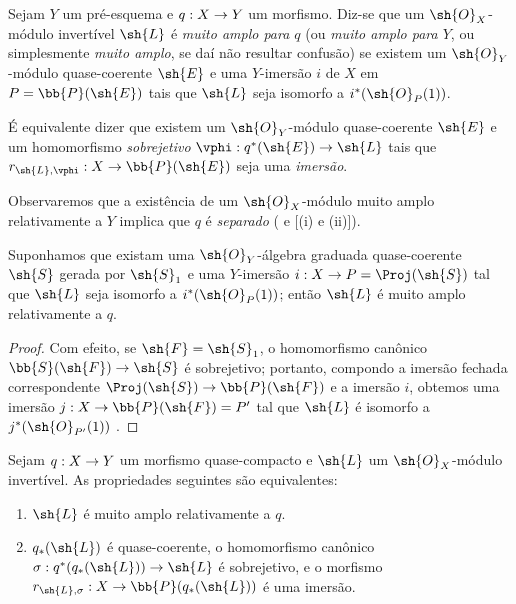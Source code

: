 \documentclass[oneside,10pt]{amsart}
\makeatletter
\newcommand{\ega@arrow}[2]{\mathchoice{#1}{#2}{#2}{#2}}
\renewcommand{\to}{\ega@arrow{\longrightarrow}{\rightarrow}}
\let\EGAOriginalLabel\label
\renewcommand{\label}[1]{\phantomsection\EGAOriginalLabel{#1}}
\makeatother
\begin{document}
\begin{definition}[4.4.2]
\label{II.4.4.2}
Sejam $Y$ um pré-esquema e $q:X\to Y$ um morfismo.
Diz-se que um $\sh{O}_X$-módulo invertível $\sh{L}$ é \emph{muito amplo para $q$} (ou \emph{muito amplo para $Y$}, ou simplesmente \emph{muito amplo}, se daí não resultar confusão) se existem um $\sh{O}_Y$-módulo quase-coerente $\sh{E}$ e uma $Y$-imersão $i$ de $X$ em $P=\bb{P}(\sh{E})$ tais que $\sh{L}$ seja isomorfo a $i^*(\sh{O}_P(1))$.
\end{definition}

É equivalente  dizer que existem um $\sh{O}_Y$-módulo quase-coerente $\sh{E}$ e um homomorfismo \emph{sobrejetivo} $\vphi:q^*(\sh{E})\to\sh{L}$ tais que $r_{\sh{L},\vphi}:X\to\bb{P}(\sh{E})$ seja uma \emph{imersão}.

Observaremos que a existência de um $\sh{O}_X$-módulo muito amplo relativamente a $Y$ implica que $q$ é \emph{separado} ( e [(i) e (ii)]).

\begin{corollary}[4.4.3]
\label{II.4.4.3}
Suponhamos que existam uma $\sh{O}_Y$-álgebra graduada quase-coerente $\sh{S}$ gerada por $\sh{S}_1$ e uma $Y$-imersão $i:X\to P=\Proj(\sh{S})$ tal que $\sh{L}$ seja isomorfo a $i^*(\sh{O}_P(1))$;
então $\sh{L}$ é muito amplo relativamente a $q$.
\end{corollary}

\begin{proof}
Com efeito, se $\sh{F}=\sh{S}_1$, o homomorfismo canônico $\bb{S}(\sh{F})\to\sh{S}$ é sobrejetivo; portanto, compondo a imersão fechada correspondente $\Proj(\sh{S})\to\bb{P}(\sh{F})$  e a imersão $i$, obtemos uma imersão $j:X\to\bb{P}(\sh{F})=P'$ tal que $\sh{L}$ é isomorfo a $j^*(\sh{O}_{P'}(1))$ .
\end{proof}

\begin{proposition}[4.4.4]
\label{II.4.4.4}
Sejam $q:X\to Y$ um morfismo quase-compacto e $\sh{L}$ um $\sh{O}_X$-módulo invertível.
As propriedades seguintes são equivalentes:
\begin{enumerate}
  \item[\rm{(a)}] $\sh{L}$ é muito amplo relativamente a $q$.
  \item[\rm{(b)}] $q_*(\sh{L})$ é quase-coerente, o homomorfismo canônico $\sigma:q^*(q_*(\sh{L}))\to\sh{L}$ é sobrejetivo, e o morfismo $r_{\sh{L},\sigma}:X\to\bb{P}(q_*(\sh{L}))$ é uma imersão.
\end{enumerate}
\end{proposition}
\end{document}
